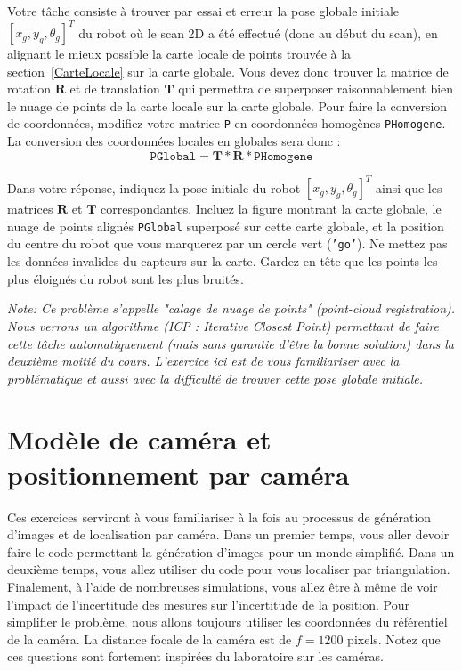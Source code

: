\documentclass[12pt]{article}
\begin{document}
Votre tâche consiste à trouver par essai et erreur la pose globale initiale $[x_g, y_g, \theta_g]^T$ du robot où le scan 2D a été effectué (donc au début du scan), en alignant le mieux possible la carte locale de points trouvée à la section~\ref{CarteLocale} sur la carte globale. Vous devez donc trouver la matrice de rotation $\mathbf{R}$ et de translation $\mathbf{T}$ qui permettra de superposer raisonnablement bien le nuage de points de la carte locale sur la carte globale. Pour faire la conversion de coordonnées, modifiez votre matrice \texttt{P} en coordonnées homogènes \texttt{PHomogene}. La conversion des coordonnées locales en globales sera donc :
$$
\texttt{PGlobal} = \mathbf{T}*\mathbf{R}*\texttt{PHomogene}
$$

Dans votre réponse, indiquez la pose initiale du robot $[x_g, y_g, \theta_g]^T$ ainsi que les matrices $\mathbf{R}$ et $\mathbf{T}$ correspondantes. Incluez la figure montrant la carte globale, le nuage de points alignés \texttt{PGlobal} superposé sur cette carte globale, et la position du centre du robot que vous marquerez par un cercle vert (\texttt{'go'}). Ne mettez pas les données invalides du capteurs sur la carte. Gardez en tête que les points les plus éloignés du robot sont les plus bruités.

\vspace{0.4 in}
\emph{Note: Ce problème s'appelle "calage de nuage de points" (point-cloud registration). Nous verrons un algorithme (\emph{ICP : Iterative Closest Point}) permettant de faire cette tâche automatiquement (mais sans garantie d'être la bonne solution) dans la deuxième moitié du cours. L'exercice ici est de vous familiariser avec la problématique et aussi avec la difficulté de trouver cette pose globale initiale.}

\newpage
\section{Modèle de caméra et positionnement par caméra}
Ces exercices serviront à vous familiariser à la fois au processus de génération d'images et de localisation par caméra. Dans un premier temps, vous aller devoir faire le code permettant la génération d'images pour un monde simplifié. Dans un deuxième temps, vous allez utiliser du code pour vous localiser par triangulation. Finalement, à l'aide de nombreuses simulations, vous allez être à même de voir l'impact de l'incertitude des mesures sur l'incertitude de la position. Pour simplifier le problème, nous allons toujours utiliser les coordonnées du référentiel de la caméra. La distance focale de la caméra est de $f=1200$ pixels. Notez que ces questions sont fortement inspirées du laboratoire sur les caméras.
\end{document}
